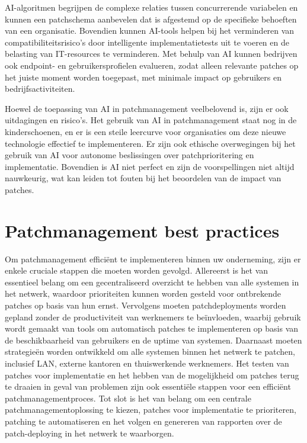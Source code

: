 AI-algoritmen begrijpen de complexe relaties tussen concurrerende variabelen en kunnen een patchschema aanbevelen dat is afgestemd op de specifieke behoeften van een organisatie. Bovendien kunnen AI-tools helpen bij het verminderen van compatibiliteitsrisico's door intelligente implementatietests uit te voeren en de belasting van IT-resources te verminderen. Met behulp van AI kunnen bedrijven ook endpoint- en gebruikersprofielen evalueren, zodat alleen relevante patches op het juiste moment worden toegepast, met minimale impact op gebruikers en bedrijfsactiviteiten.

Hoewel de toepassing van AI in patchmanagement veelbelovend is, zijn er ook uitdagingen en risico's. Het gebruik van AI in patchmanagement staat nog in de kinderschoenen, en er is een steile leercurve voor organisaties om deze nieuwe technologie effectief te implementeren. Er zijn ook ethische overwegingen bij het gebruik van AI voor autonome beslissingen over patchprioritering en implementatie. Bovendien is AI niet perfect en zijn de voorspellingen niet altijd nauwkeurig, wat kan leiden tot fouten bij het beoordelen van de impact van patches. \autocite{OFlaherty2023}

\section{Patchmanagement best practices}
Om patchmanagement efficiënt te implementeren binnen uw onderneming, zijn er enkele cruciale stappen die moeten worden gevolgd. Allereerst is het van essentieel belang om een gecentraliseerd overzicht te hebben van alle systemen in het netwerk, waardoor prioriteiten kunnen worden gesteld voor ontbrekende patches op basis van hun ernst. Vervolgens moeten patchdeployments worden gepland zonder de productiviteit van werknemers te beïnvloeden, waarbij gebruik wordt gemaakt van tools om automatisch patches te implementeren op basis van de beschikbaarheid van gebruikers en de uptime van systemen. Daarnaast moeten strategieën worden ontwikkeld om alle systemen binnen het netwerk te patchen, inclusief LAN, externe kantoren en thuiswerkende werknemers. Het testen van patches voor implementatie en het hebben van de mogelijkheid om patches terug te draaien in geval van problemen zijn ook essentiële stappen voor een efficiënt patchmanagementproces. Tot slot is het van belang om een centrale patchmanagementoplossing te kiezen, patches voor implementatie te prioriteren, patching te automatiseren en het volgen en genereren van rapporten over de patch-deploying in het netwerk te waarborgen. \autocite{ManageEngine2024}



